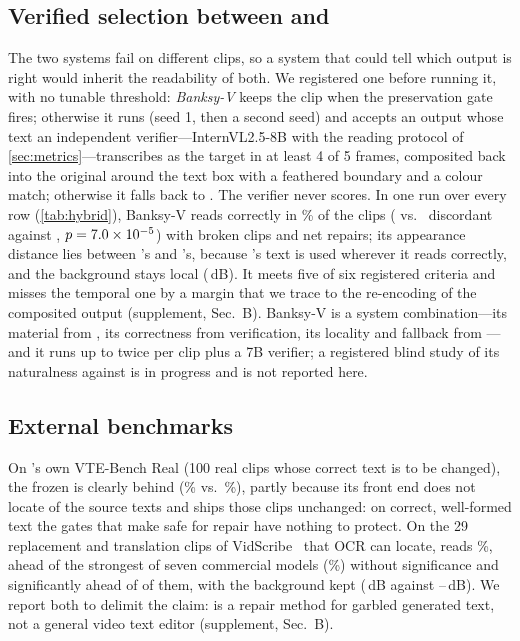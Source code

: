 \subsection{Verified selection between \method and \steer}
\label{sec:exp_hybrid}

The two systems fail on different clips, so a system that could tell which output is right would inherit the readability of both. We registered one before running it, with no tunable threshold: \emph{Banksy-V} keeps the clip when the preservation gate fires; otherwise it runs \steer (seed 1, then a second seed) and accepts an output whose text an independent verifier---InternVL2.5-8B with the reading protocol of \cref{sec:metrics}---transcribes as the target in at least 4 of 5 frames, composited back into the original around the text box with a feathered boundary and a colour match; otherwise it falls back to \method. The verifier never scores. In one run over every row (\cref{tab:hybrid}), Banksy-V reads correctly in \hVRead\% of the clips (\hVOnlySys{} vs.\ \hVOnlyBone{} discordant against \method, $p=7.0\times10^{-5}$) with \hVBroken{} broken clips and \hVNet{} net repairs; its appearance distance lies between \steer's and \method's, because \steer's text is used wherever it reads correctly, and the background stays local (\hVBG\,dB). It meets five of six registered criteria and misses the temporal one by a margin that we trace to the re-encoding of the composited output (supplement, Sec.~B). Banksy-V is a system combination---its material from \steer, its correctness from verification, its locality and fallback from \method---and it runs \steer up to twice per clip plus a 7B verifier; a registered blind study of its naturalness against \steer is in progress and is not reported here.

\subsection{External benchmarks}
\label{sec:exp_external}
On \steer's own VTE-Bench Real (100 real clips whose correct text is to be changed), the frozen \method is clearly behind \steer (\xVteOurs\% vs.\ \xVteSteer\%), partly because its front end does not locate \xVteFails{} of the source texts and ships those clips unchanged: on correct, well-formed text the gates that make \method safe for repair have nothing to protect. On the 29 replacement and translation clips of VidScribe~\cite{vidscribe2026} that OCR can locate, \method reads \xVsOurs\%, ahead of the strongest of seven commercial models (\xVsBest\%) without significance and significantly ahead of \xVsSig{} of them, with the background kept (\xVsOursBG\,dB against \xVsBGLo--\xVsBGHi\,dB). We report both to delimit the claim: \method is a repair method for garbled generated text, not a general video text editor (supplement, Sec.~B).
